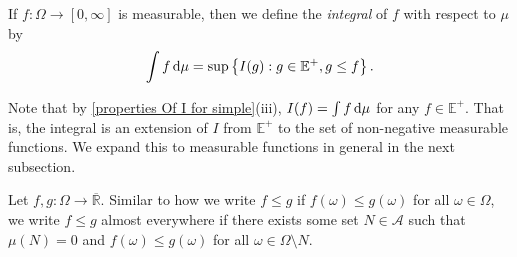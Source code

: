 \begin{definition}[Integral]
    If $f:\Omega\to[0,\infty]$ is measurable, then we define the \textit{integral} of $f$ with respect to $\mu$ by
    $$\int f\operatorname{d}\!{\mu} = \sup\left\{I(g):g\in\mathbb{E}^+, g\leq f\right\}.$$
\end{definition}

Note that by \cref{properties Of I for simple}(iii), $I(f)=\int f\operatorname{d}\!{\mu}$ for any $f\in\mathbb{E}^+$. That is, the integral is an extension of $I$ from $\mathbb{E}^+$ to the set of non-negative measurable functions. We expand this to measurable functions in general in the next subsection.

\vspace{2mm}
Let $f,g:\Omega\to\overline{\mathbb{R}}$. Similar to how we write $f\leq g$ if $f(\omega)\leq g(\omega)$ for all $\omega\in\Omega$, we write $f\leq g$ almost everywhere if there exists some set $N\in\mathcal{A}$ such that $\mu(N)=0$ and $f(\omega)\leq g(\omega)$ for all $\omega\in\Omega\setminus N$.

